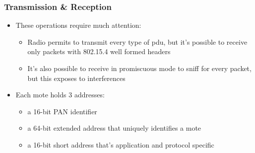\begin{frame}[fragile]
  \frametitle{Transmission \& Reception}
  \begin{itemize}
    \item These operations require much attention:
    \begin{itemize}
    	\item Radio permits to transmit every type of pdu, but it's possible to receive only packets with 802.15.4 well formed headers
    	\item It's also possible to receive in promiscuous mode to sniff for every packet, but this exposes to interferences
    \end{itemize}
    \item Each mote holds 3 addresses:
    \begin{itemize}
    	\item a 16-bit PAN identifier
    	\item a 64-bit extended address that uniquely identifies a mote
    	\item a 16-bit short address that's application and protocol specific
    \end{itemize}
  \end{itemize}
\end{frame}

